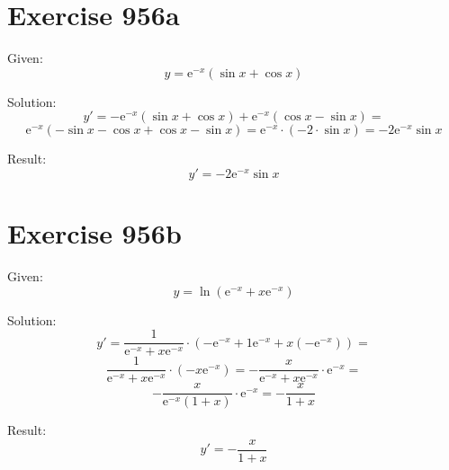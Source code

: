 \documentclass[a4paper, 10pt]{scrartcl}
\newcommand*\euler{\mathrm{e}}
\begin{document}
\section{Exercise 956a}

Given:
\[
y = \euler^{-x}(\sin{x} + \cos{x})
\]

Solution:
\[
y' = -\euler^{-x}(\sin{x} + \cos{x}) + \euler^{-x}(\cos{x} - \sin{x}) =
\]
\[
\euler^{-x}(-\sin{x} - \cos{x} + \cos{x} - \sin{x}) = \euler^{-x}\cdot(-2\cdot\sin{x}) = -2\euler^{-x}\sin{x}
\]

Result:
\[
y' = -2\euler^{-x}\sin{x}
\]

\section{Exercise 956b}

Given:
\[
y = \ln{(\euler^{-x} + x\euler^{-x})}
\]

Solution:
\[
y' = \frac{1}{\euler^{-x} + x\euler^{-x}}\cdot\left(-\euler^{-x} + 1\euler^{-x} + x(-\euler^{-x})\right) =
\]
\[
\frac{1}{\euler^{-x} + x\euler^{-x}}\cdot(-x\euler^{-x}) = -\frac{x}{\euler^{-x} + x\euler^{-x}}\cdot\euler^{-x} =
\]
\[
-\frac{x}{\euler^{-x}(1 + x)}\cdot\euler^{-x} = -\frac{x}{1 + x}
\]

Result:
\[
y' = -\frac{x}{1 + x}
\]
\end{document}
